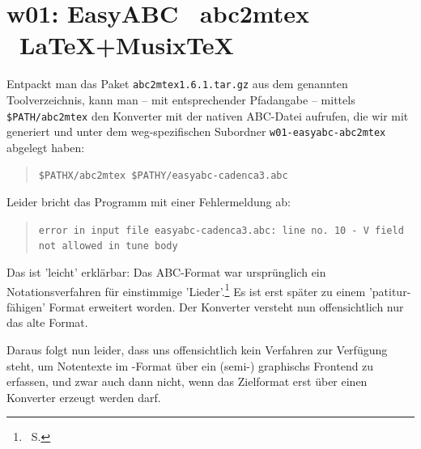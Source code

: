 %
%
%

\section{w01: Easy\-ABC \ra\ abc2mtex \ra\ \LaTeX+Musix\TeX}\label{w01}

Entpackt man das Paket \texttt{abc2mtex1.6.1.tar.gz} aus dem genannten
Toolverzeichnis, kann man -- mit entsprechender Pfadangabe -- mittels
\texttt{\$PATH/abc2mtex} den Konverter mit der nativen ABC-Datei aufrufen, die
wir mit  generiert und unter dem weg-spezifischen Subordner
\texttt{w01-easyabc-abc2mtex} abgelegt haben:


\begin{quote}\texttt{\$PATHX/abc2mtex \$PATHY/easyabc-cadenca3.abc}\end{quote}

Leider bricht das Programm mit einer Fehlermeldung ab:

\begin{quote}\texttt{error in input file easyabc-cadenca3.abc: line no. 10 - V
field not allowed in tune body }\end{quote}

Das ist 'leicht' erklärbar: Das ABC-Format war ursprünglich ein
Notationsverfahren für einstimmige 'Lieder'.\footnote{\ra\ S. \pageref{ABCMethod}}
Es ist erst später zu einem 'patitur-fähigen' Format erweitert worden. Der
Konverter  versteht nun offensichtlich nur das alte Format.
 
Daraus folgt nun leider, dass uns offensichtlich kein Verfahren zur Verfügung
steht, um Notentexte im -Format über ein (semi-) graphischs
Frontend zu erfassen, und zwar auch dann nicht, wenn das Zielformat erst über
einen Konverter erzeugt werden darf.

